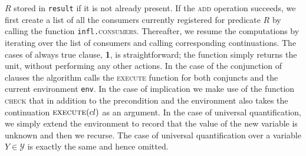 $R$ stored in \texttt{result} if it is not already present. If the
\textsc{add} operation succeeds, we first create a list of all the
consumers currently registered for predicate $R$ by calling the
function \texttt{infl.}\textsc{consumers}. Thereafter, we resume the
computations by iterating over the list of consumers and calling
corresponding continuations.
The cases of always true clause, {\bf 1}, is straightforward; the
function simply returns the unit, without performing any other
actions.
In the case of the conjunction of clauses the algorithm calls the
\textsc{execute} function for both conjuncts and the current
environment \texttt{env}.
In the case of implication we make use of the function \textsc{check}
that in addition to the precondition and the environment also takes
the continuation $\textsc{execute}(cl)$ as an argument.
In the case of universal quantification, we simply extend the
environment to record that the value of the new variable is unknown
and then we recurse. The case of universal quantification over a
variable $Y \in \mathcal{Y}$ is exactly the same and hence omitted.

